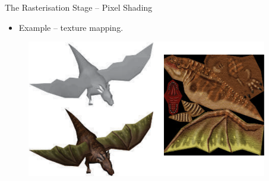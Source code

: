\documentclass{beamer}
\begin{document}
\begin{frame}{The Rasterisation Stage -- Pixel Shading}

	\begin{itemize}
		\item Example -- texture mapping.
	\end{itemize}

	\vskip 1cm

	\begin{figure}[t]
		\includegraphics[height=6cm]{texture-mapping}
		\centering
	\end{figure}

\end{frame}
\end{document}
